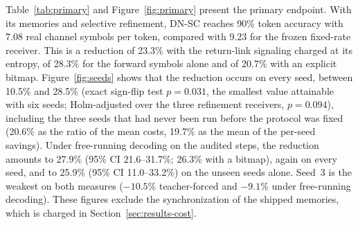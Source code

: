 Table~\ref{tab:primary} and Figure~\ref{fig:primary} present the primary endpoint. With its memories and selective refinement, DN-SC reaches 90\% token accuracy with 7.08 real channel symbols per token, compared with 9.23 for the frozen fixed-rate receiver. This is a reduction of 23.3\% with the return-link signaling charged at its entropy, of 28.3\% for the forward symbols alone and of 20.7\% with an explicit bitmap. Figure~\ref{fig:seeds} shows that the reduction occurs on every seed, between 10.5\% and 28.5\% (exact sign-flip test $p = 0.031$, the smallest value attainable with six seeds; Holm-adjusted over the three refinement receivers, $p = 0.094$), including the three seeds that had never been run before the protocol was fixed (20.6\% as the ratio of the mean costs, 19.7\% as the mean of the per-seed savings). Under free-running decoding on the audited steps, the reduction amounts to 27.9\% (95\% CI 21.6--31.7\%; 26.3\% with a bitmap), again on every seed, and to 25.9\% (95\% CI 11.0--33.2\%) on the unseen seeds alone. Seed~3 is the weakest on both measures ($-10.5$\% teacher-forced and $-9.1$\% under free-running decoding). These figures exclude the synchronization of the shipped memories, which is charged in Section~\ref{sec:results-cost}.

